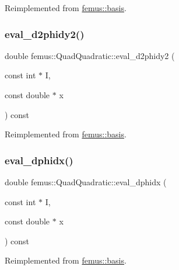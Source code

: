 Reimplemented from \mbox{\hyperlink{classfemus_1_1basis_ac9feaf9e60421143db2a3708f3c7fa48}{femus\+::basis}}.

\mbox{\label{classfemus_1_1_quad_quadratic_a265d47435257f480aa10db30913d9780}} 
\subsubsection{\texorpdfstring{eval\+\_\+d2phidy2()}{eval\_d2phidy2()}}
{\footnotesize\ttfamily double femus\+::\+Quad\+Quadratic\+::eval\+\_\+d2phidy2 (\begin{DoxyParamCaption}\item[{const int $\ast$}]{I,  }\item[{const double $\ast$}]{x }\end{DoxyParamCaption}) const\hspace{0.3cm}{\ttfamily [virtual]}}



Reimplemented from \mbox{\hyperlink{classfemus_1_1basis_a0febb29fe4b32213ff8d6d428f7241cd}{femus\+::basis}}.

\mbox{\label{classfemus_1_1_quad_quadratic_ad8c70fc688c0ce5a9bac35437d8c09a8}} 
\subsubsection{\texorpdfstring{eval\+\_\+dphidx()}{eval\_dphidx()}}
{\footnotesize\ttfamily double femus\+::\+Quad\+Quadratic\+::eval\+\_\+dphidx (\begin{DoxyParamCaption}\item[{const int $\ast$}]{I,  }\item[{const double $\ast$}]{x }\end{DoxyParamCaption}) const\hspace{0.3cm}{\ttfamily [virtual]}}



Reimplemented from \mbox{\hyperlink{classfemus_1_1basis_a4db7d29cf8a753ddbccc4a297dafa0bf}{femus\+::basis}}.

